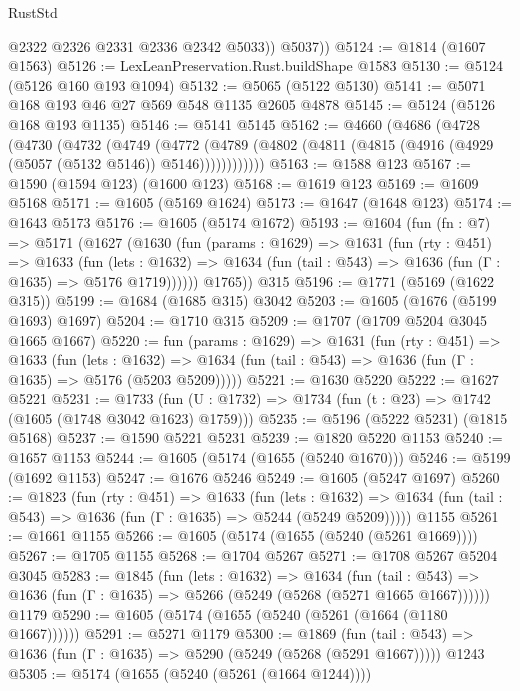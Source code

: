\begin{lexlean}{RustStd}
\begin{coremodule}
{\begin{coremodule}
{{{{{{{{{{{{{{            @2322
            @2326
            @2331
            @2336
            @2342
            @5033))
        @5037))
@5124 := @1814 (@1607 @1563)
@5126 := LexLeanPreservation.Rust.buildShape @1583
@5130 := @5124 (@5126 @160 @193 @1094)
@5132 := @5065 (@5122 @5130)
@5141 := @5071 @168 @193 @46 @27 @569 @548 @1135 @2605 @4878
@5145 := @5124 (@5126 @168 @193 @1135)
@5146 := @5141 @5145
@5162 := @4660
    (@4686
      (@4728
        (@4730
          (@4732
            (@4749
              (@4772
                (@4789 (@4802 (@4811 (@4815 (@4916 (@4929 (@5057 (@5132 @5146)) @5146))))))))))))
@5163 := @1588 @123
@5167 := @1590 (@1594 @123) (@1600 @123)
@5168 := @1619 @123
@5169 := @1609 @5168
@5171 := @1605 (@5169 @1624)
@5173 := @1647 (@1648 @123)
@5174 := @1643 @5173
@5176 := @1605 (@5174 @1672)
@5193 := @1604
    (fun (fn : @7) =>
    @5171
      (@1627
        (@1630
          (fun (params : @1629) =>
          @1631
            (fun (rty : @451) =>
            @1633
              (fun (lets : @1632) =>
              @1634 (fun (tail : @543) => @1636 (fun (Γ : @1635) => @5176 @1719))))))
        @1765))
    @315
@5196 := @1771 (@5169 (@1622 @315))
@5199 := @1684 (@1685 @315) @3042
@5203 := @1605 (@1676 (@5199 @1693) @1697)
@5204 := @1710 @315
@5209 := @1707 (@1709 @5204 @3045 @1665 @1667)
@5220 := fun (params : @1629) =>
  @1631
    (fun (rty : @451) =>
    @1633
      (fun (lets : @1632) =>
      @1634 (fun (tail : @543) => @1636 (fun (Γ : @1635) => @5176 (@5203 @5209)))))
@5221 := @1630 @5220
@5222 := @1627 @5221
@5231 := @1733 (fun (U : @1732) => @1734 (fun (t : @23) => @1742 (@1605 (@1748 @3042 @1623) @1759)))
@5235 := @5196 (@5222 @5231) (@1815 @5168)
@5237 := @1590 @5221 @5231
@5239 := @1820 @5220 @1153
@5240 := @1657 @1153
@5244 := @1605 (@5174 (@1655 (@5240 @1670)))
@5246 := @5199 (@1692 @1153)
@5247 := @1676 @5246
@5249 := @1605 (@5247 @1697)
@5260 := @1823
    (fun (rty : @451) =>
    @1633
      (fun (lets : @1632) =>
      @1634 (fun (tail : @543) => @1636 (fun (Γ : @1635) => @5244 (@5249 @5209)))))
    @1155
@5261 := @1661 @1155
@5266 := @1605 (@5174 (@1655 (@5240 (@5261 @1669))))
@5267 := @1705 @1155
@5268 := @1704 @5267
@5271 := @1708 @5267 @5204 @3045
@5283 := @1845
    (fun (lets : @1632) =>
    @1634
      (fun (tail : @543) => @1636 (fun (Γ : @1635) => @5266 (@5249 (@5268 (@5271 @1665 @1667))))))
    @1179
@5290 := @1605 (@5174 (@1655 (@5240 (@5261 (@1664 (@1180 @1667))))))
@5291 := @5271 @1179
@5300 := @1869
    (fun (tail : @543) => @1636 (fun (Γ : @1635) => @5290 (@5249 (@5268 (@5291 @1667)))))
    @1243
@5305 := @5174 (@1655 (@5240 (@5261 (@1664 @1244))))
}}}}}}}}}}}}}}
\end{coremodule}}
\end{coremodule}
\end{lexlean}
